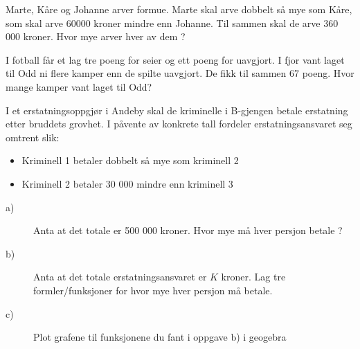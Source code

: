 \documentclass[a4, 11pt, twoside]{article}
\theoremstyle{definition}
\begin{document}
\begin{Exercise}
Marte, Kåre og Johanne arver formue. Marte skal arve dobbelt så mye som
Kåre, som skal arve 60000 kroner mindre enn Johanne. Til sammen skal
de arve 360 000 kroner. Hvor mye arver hver av dem ?
\end{Exercise}

\begin{Exercise}
I fotball får et lag tre poeng for seier og ett poeng for uavgjort.
I fjor vant laget til Odd ni flere kamper enn de spilte uavgjort. De
fikk til sammen 67 poeng. \newline
Hvor mange kamper vant laget til Odd?
\end{Exercise}

\begin{Exercise}
I et erstatningsoppgjør i Andeby skal de kriminelle i B-gjengen 
betale erstatning etter bruddets grovhet. I påvente av konkrete tall
fordeler erstatningsansvaret seg omtrent slik:
\begin{itemize}
\item Kriminell 1 betaler dobbelt så mye som kriminell 2
\item Kriminell 2 betaler 30 000 mindre enn kriminell 3
\end{itemize}
\begin{description}
\item[a)] Anta at det totale er 500 000 kroner. Hvor mye må hver persjon betale ?
\item[b)] Anta at det totale erstatningsansvaret er $K$ kroner. Lag tre formler/funksjoner for hvor
          mye hver persjon må betale.
\item[c)] Plot grafene til funksjonene du fant i oppgave b) i geogebra
\end{description}
\end{Exercise}

\end{document}

